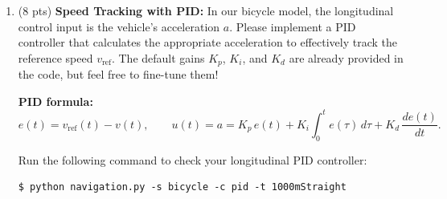 \documentclass[11pt]{article}
\begin{document}
\begin{enumerate}
\begin{enumerate}
                    \textbf{Hint:} In practice, $\kappa$ can be zero on straight segments. To avoid division by zero, add a small constant (e.g., $\epsilon = 10^{-6}$) to the denominator: $|\kappa| + \epsilon$.
              \item \textbf{Longitudinal smoothing (8 pts):} Apply a forward--backward pass ensuring the velocity profile respects acceleration and braking limits.
                    \begin{itemize}
                        \item \textbf{Forward pass:} limit acceleration ($a_{\mathrm{acc}}=12\mathrm{m/s^2}$).
                              \[
                                  v_i^2 \le v_{i-1}^2 + 2\cdot a_{\mathrm{acc}} \cdot ds
                              \]
                        \item \textbf{Backward pass:} limit deceleration ($a_{\mathrm{dec}}=18\mathrm{m/s^2}$) so the vehicle slows down before corners.
                              \[
                                  v_i^2 \le v_{i+1}^2 + 2\cdot a_{\mathrm{dec}} \cdot ds
                              \]
                        \item \textbf{Launch Restrictions:}
                              \begin{itemize}
                                  \item Starting Speed ($v_{\mathrm{ref}}[0]$): 5.0 m/s
                                  \item Terminal Target Speed ($v_{\mathrm{ref}}[-1]$): 0.0 m/s
                              \end{itemize}
                    \end{itemize}
                    \textbf{Hint:} Think carefully about where to apply each restriction.
          \end{enumerate}
          Run the following command to check your velocity profile:
          \begin{lstlisting}
$ python trajectory_generator.py
          \end{lstlisting}

    \item \textbf{\faPython} (8 pts) \textbf{Speed Tracking with PID:} In our bicycle model, the longitudinal control input is the vehicle's acceleration $a$. Please implement a PID controller that calculates the appropriate acceleration to effectively track the reference speed $v_{\mathrm{ref}}$. 
          The default gains $K_p$, $K_i$, and $K_d$ are already provided in the code, but feel free to fine-tune them!


          \noindent\textbf{PID formula:}
          \[
              e(t) = v_{\mathrm{ref}}(t) - v(t),
              \qquad
              u(t) = a = K_p\,e(t) + K_i\int_0^t e(\tau)\,d\tau + K_d\,\frac{de(t)}{dt}.
          \]

          Run the following command to check your longitudinal PID controller:
          \begin{lstlisting}
$ python navigation.py -s bicycle -c pid -t 1000mStraight
          \end{lstlisting}
\end{enumerate}
\end{document}

